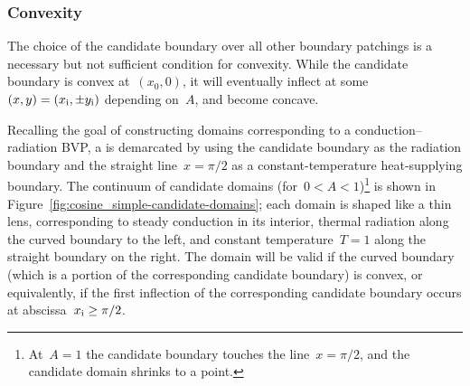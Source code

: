 \subsubsection{Convexity}
\label{sec:cartesian.cosine.simple.convexity}

The choice of the candidate boundary over all other boundary patchings
is a necessary but not sufficient condition for convexity.
While the candidate boundary is convex at~$(x_0, 0)$,
it will eventually inflect
at some~$(x, y) = (x_{\mathrm{i}}, \pm y_{\mathrm{i}})$ depending on~$A$,
and become concave.

Recalling the goal of constructing domains
corresponding to a conduction--radiation BVP\@,
a  is demarcated by using
the candidate boundary as the radiation boundary
and the straight line~$x = \pi/2$
as a constant-temperature heat-supplying boundary.
The continuum of candidate domains (for~$0 < A < 1$)\footnote{
  At~$A = 1$ the candidate boundary touches the line~$x = \pi/2$,
  and the candidate domain shrinks to a point.
}
is shown in Figure~\ref{fig:cosine_simple-candidate-domains};
each domain is shaped like a thin lens,
corresponding to steady conduction in its interior,
thermal radiation along the curved boundary to the left,
and constant temperature~$T = 1$ along the straight boundary on the right.
The domain will be valid if the curved boundary
(which is a portion of the corresponding candidate boundary)
is convex, or equivalently,
if the first inflection of the corresponding candidate boundary
occurs at abscissa~$x_{\mathrm{i}} \ge \pi/2$.

\begin{figure}
\end{figure}

